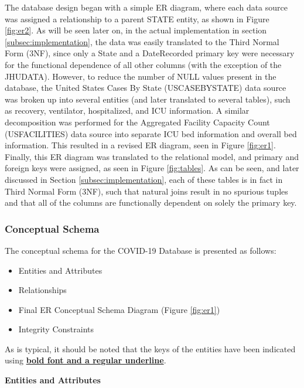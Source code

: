 \documentclass[11pt]{article}
\begin{document}
\noindent
The database design began with a simple ER diagram, where each data source was assigned a relationship to a parent STATE entity, as shown in Figure \ref{fig:er2}. As will be seen later on, in the actual implementation in section \ref{subsec:implementation}, the data was easily translated to the Third Normal Form (3NF), since only a State and a DateRecorded primary key were necessary for the functional dependence of all other columns (with the exception of the JHUDATA). However, to reduce the number of NULL values present in the database, the United States Cases By State (USCASEBYSTATE) data source was broken up into several entities (and later translated to several tables), such as recovery, ventilator, hospitalized, and ICU information. A similar decomposition was performed for the Aggregated Facility Capacity Count (USFACILITIES) data source into separate ICU bed information and overall bed information. This resulted in a revised ER diagram, seen in Figure \ref{fig:er1}. Finally, this ER diagram was translated to the relational model, and primary and foreign keys were assigned, as seen in Figure \ref{fig:tables}. As can be seen, and later discussed in Section \ref{subsec:implementation}, each of these tables is in fact in Third Normal Form (3NF), such that natural joins result in no spurious tuples and that all of the columns are functionally dependent on solely the primary key. 

\subsubsection{Conceptual Schema}
\label{subsubsec:concept}

\noindent
The conceptual schema for the COVID-19 Database is presented as follows:

\begin{itemize}
    \item Entities and Attributes
    \item Relationships
    \item Final ER Conceptual Schema Diagram (Figure \ref{fig:er1})
    \item Integrity Constraints
\end{itemize}

\noindent
As is typical, it should be noted that the keys of the entities have been indicated using \textbf{\underline{bold font and a regular underline}}.

\pagebreak

\noindent
\textbf{Entities and Attributes}
\end{document}
